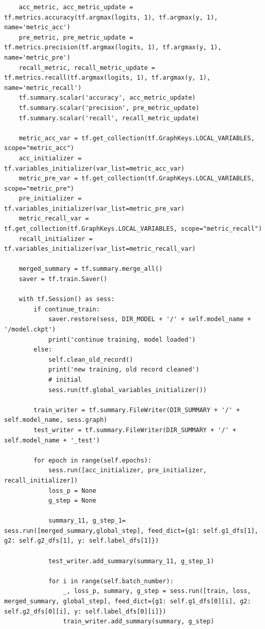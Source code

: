 \begin{code}
\begin{verbatim}
    acc_metric, acc_metric_update = tf.metrics.accuracy(tf.argmax(logits, 1), tf.argmax(y, 1), name='metric_acc')
    pre_metric, pre_metric_update = tf.metrics.precision(tf.argmax(logits, 1), tf.argmax(y, 1), name='metric_pre')
    recall_metric, recall_metric_update = tf.metrics.recall(tf.argmax(logits, 1), tf.argmax(y, 1), name='metric_recall')
    tf.summary.scalar('accuracy', acc_metric_update)
    tf.summary.scalar('precision', pre_metric_update)
    tf.summary.scalar('recall', recall_metric_update)

    metric_acc_var = tf.get_collection(tf.GraphKeys.LOCAL_VARIABLES, scope="metric_acc")
    acc_initializer = tf.variables_initializer(var_list=metric_acc_var)
    metric_pre_var = tf.get_collection(tf.GraphKeys.LOCAL_VARIABLES, scope="metric_pre")
    pre_initializer = tf.variables_initializer(var_list=metric_pre_var)
    metric_recall_var = tf.get_collection(tf.GraphKeys.LOCAL_VARIABLES, scope="metric_recall")
    recall_initializer = tf.variables_initializer(var_list=metric_recall_var)

    merged_summary = tf.summary.merge_all()
    saver = tf.train.Saver()

    with tf.Session() as sess:
        if continue_train:
            saver.restore(sess, DIR_MODEL + '/' + self.model_name + '/model.ckpt')
            print('continue training, model loaded')
        else:
            self.clean_old_record()
            print('new training, old record cleaned')
            # initial
            sess.run(tf.global_variables_initializer())

        train_writer = tf.summary.FileWriter(DIR_SUMMARY + '/' + self.model_name, sess.graph)
        test_writer = tf.summary.FileWriter(DIR_SUMMARY + '/' + self.model_name + '_test')

        for epoch in range(self.epochs):
            sess.run([acc_initializer, pre_initializer, recall_initializer])
            loss_p = None
            g_step = None

            summary_11, g_step_1= sess.run([merged_summary,global_step], feed_dict={g1: self.g1_dfs[1], g2: self.g2_dfs[1], y: self.label_dfs[1]})

            test_writer.add_summary(summary_11, g_step_1)

            for i in range(self.batch_number):
                _, loss_p, summary, g_step = sess.run([train, loss, merged_summary, global_step], feed_dict={g1: self.g1_dfs[0][i], g2: self.g2_dfs[0][i], y: self.label_dfs[0][i]})
                train_writer.add_summary(summary, g_step)


\end{verbatim}
\end{code}
